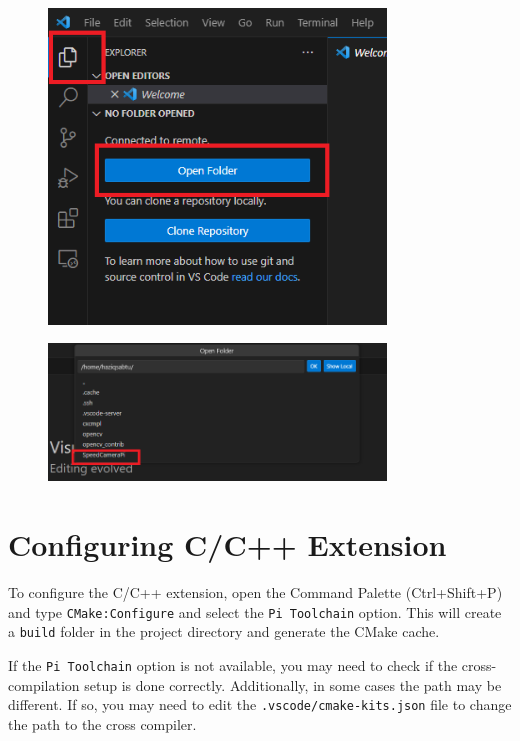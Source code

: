 \begin{figure}[H]
      \centering
      \includegraphics[width=0.8\textwidth]{texs/chapter1/image/wslfolder.png}
\end{figure}

\begin{figure}[H]
      \centering
      \includegraphics[width=0.8\textwidth]{texs/chapter1/image/wslfolder2.png}
\end{figure}

\section{Configuring C/C++ Extension}

To configure the C/C++ extension, open the Command Palette (Ctrl+Shift+P) and type \texttt{CMake:Configure} and select the \texttt{Pi Toolchain} option. This will create a \texttt{build} folder in the project directory and generate the CMake cache.

If the \texttt{Pi Toolchain} option is not available, you may need to check if the cross-compilation setup is done correctly. Additionally, in some cases the path may be different. If so, you may need to edit the \texttt{.vscode/cmake-kits.json} file to change the path to the cross compiler.

